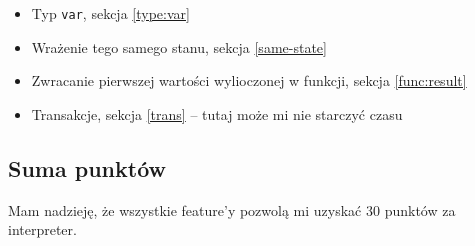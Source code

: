 \documentclass{article}
\begin{document}
\begin{itemize}
    \item Typ \texttt{var}, sekcja \ref{type:var}
    \item Wrażenie tego samego stanu, sekcja \ref{same-state}
    \item Zwracanie pierwszej wartości wylioczonej w funkcji, sekcja \ref{func:result}
    \item Transakcje, sekcja \ref{trans} -- tutaj może mi nie starczyć czasu
\end{itemize}

\subsection{Suma punktów}

Mam nadzieję, że wszystkie feature'y pozwolą mi uzyskać 30 punktów za interpreter.
\end{document}
